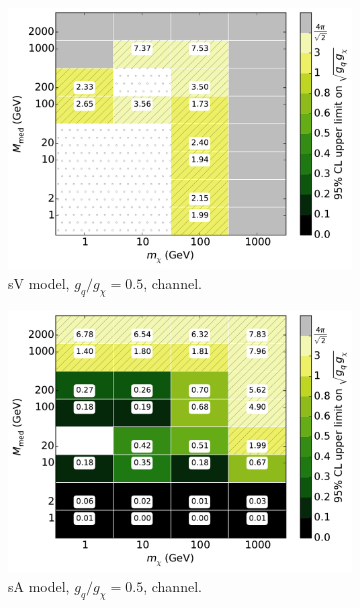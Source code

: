 \begin{figure}
\begin{subfigure}[t]{0.32\textwidth}
    \centering
    \includegraphics[width=1.\textwidth]{figures/grid_basepoints_SVD_rat05_monoWZ.pdf}
    \caption{sV model, $g_q/g_{\chi} = 0.5$, \monoWZ channel.}
    \vspace{0.75cm}
  \end{subfigure}
  \begin{subfigure}[t]{0.32\textwidth}
    \centering
    \includegraphics[width=1.\textwidth]{figures/grid_basepoints_SAD_rat05_monojet.pdf}
    \caption{sA model, $g_q/g_{\chi} = 0.5$, \monojet channel.}
  \end{subfigure}
  \begin{subfigure}[t]{0.32\textwidth}
    \centering

\end{subfigure}
\end{figure}
